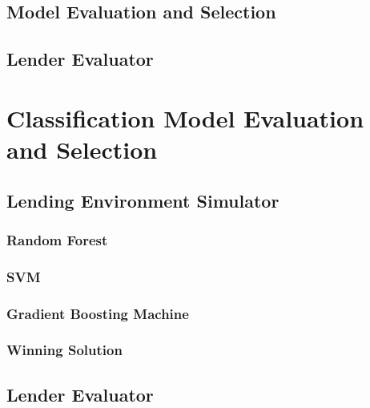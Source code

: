\hypertarget{model-evaluation-and-selection}{%
\subsection{Model Evaluation and
Selection}\label{model-evaluation-and-selection}}

\hypertarget{lender-evaluator}{%
\subsection{Lender Evaluator}\label{lender-evaluator}}

\hypertarget{classification-model-evaluation-and-selection}{%
\section{Classification Model Evaluation and
Selection}\label{classification-model-evaluation-and-selection}}

\hypertarget{lending-environment-simulator}{%
\subsection{Lending Environment
Simulator}\label{lending-environment-simulator}}

\hypertarget{random-forest}{%
\subsubsection{Random Forest}\label{random-forest}}

\hypertarget{svm}{%
\subsubsection{SVM}\label{svm}}

\hypertarget{gradient-boosting-machine}{%
\subsubsection{Gradient Boosting
Machine}\label{gradient-boosting-machine}}

\hypertarget{winning-solution}{%
\subsubsection{Winning Solution}\label{winning-solution}}

\hypertarget{lender-evaluator-1}{%
\subsection{Lender Evaluator}\label{lender-evaluator-1}}

